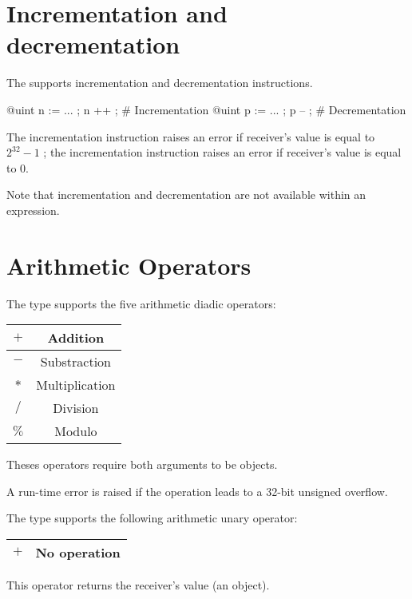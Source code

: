 \section{Incrementation and decrementation}

The  supports incrementation and decrementation instructions.

\begin{galgascode}
@uint n := ... ; n ++ ; # Incrementation
@uint p := ... ; p -- ; # Decrementation
\end{galgascode}


The incrementation instruction raises an error if receiver's value is equal to $2^{32}-1$ ; the incrementation instruction raises an error if receiver's value is equal to 0.

Note that incrementation and decrementation are not available within an expression.




\section{Arithmetic Operators}

The  type supports the five arithmetic diadic operators:\newline

\begin{tabular}{|c|c|}
\hline
$+$ & Addition \\
\hline
$-$ & Substraction \\
\hline
$*$ & Multiplication \\
\hline
$/$ & Division \\
\hline
$\%$ & Modulo \\
\hline
\end{tabular}

Theses operators require both arguments to be  objects.\newline

A run-time error is raised if the operation leads to a 32-bit unsigned overflow.

The  type supports the following arithmetic unary operator:\newline

\begin{tabular}{|c|c|}
\hline
$+$ & No operation \\
\hline
\end{tabular}

This operator returns the receiver's value (an   object).






